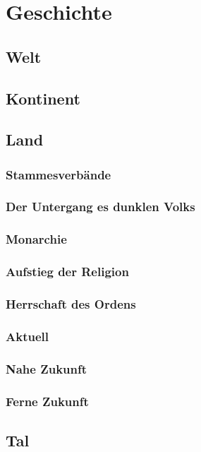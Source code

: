 \chapter{Geschichte}
\section{Welt}
\section{Kontinent}
\section{Land}
\subsection{Stammesverbände}
\subsection{Der Untergang es dunklen Volks}
\subsection{Monarchie}
\subsection{Aufstieg der Religion}
\subsection{Herrschaft des Ordens}
\subsection{Aktuell}
\subsection{Nahe Zukunft}
\subsection{Ferne Zukunft}

\section{Tal}